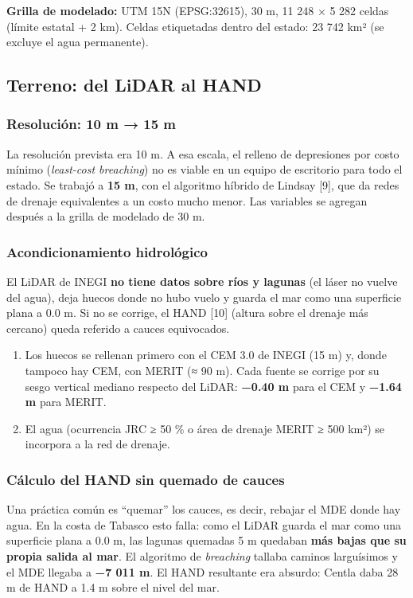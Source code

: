 \textbf{Grilla de modelado:} UTM 15N (EPSG:32615), 30 m, 11 248 × 5 282 celdas (límite estatal + 2 km). Celdas etiquetadas dentro del estado: 23 742 km² (se excluye el agua permanente).

\subsection{Terreno: del LiDAR al HAND}

\subsubsection{Resolución: 10 m → 15 m}

La resolución prevista era 10 m. A esa escala, el relleno de depresiones por costo mínimo (\emph{least-cost breaching}) no es viable en un equipo de escritorio para todo el estado. Se trabajó a \textbf{15 m}, con el algoritmo híbrido de Lindsay {[}9{]}, que da redes de drenaje equivalentes a un costo mucho menor. Las variables se agregan después a la grilla de modelado de 30 m.

\subsubsection{Acondicionamiento hidrológico}

El LiDAR de INEGI \textbf{no tiene datos sobre ríos y lagunas} (el láser no vuelve del agua), deja huecos donde no hubo vuelo y guarda el mar como una superficie plana a 0.0 m. Si no se corrige, el HAND {[}10{]} (altura sobre el drenaje más cercano) queda referido a cauces equivocados.

\begin{enumerate}
\def\labelenumi{\arabic{enumi}.}
\tightlist
\item
  Los huecos se rellenan primero con el CEM 3.0 de INEGI (15 m) y, donde tampoco hay CEM, con MERIT (≈ 90 m). Cada fuente se corrige por su sesgo vertical mediano respecto del LiDAR: \textbf{−0.40 m} para el CEM y \textbf{−1.64 m} para MERIT.
\item
  El agua (ocurrencia JRC ≥ 50 \% o área de drenaje MERIT ≥ 500 km²) se incorpora a la red de drenaje.
\end{enumerate}

\subsubsection{Cálculo del HAND sin quemado de cauces}

Una práctica común es ``quemar'' los cauces, es decir, rebajar el MDE donde hay agua. En la costa de Tabasco esto falla: como el LiDAR guarda el mar como una superficie plana a 0.0 m, las lagunas quemadas 5 m quedaban \textbf{más bajas que su propia salida al mar}. El algoritmo de \emph{breaching} tallaba caminos larguísimos y el MDE llegaba a \textbf{−7 011 m}. El HAND resultante era absurdo: Centla daba 28 m de HAND a 1.4 m sobre el nivel del mar.

